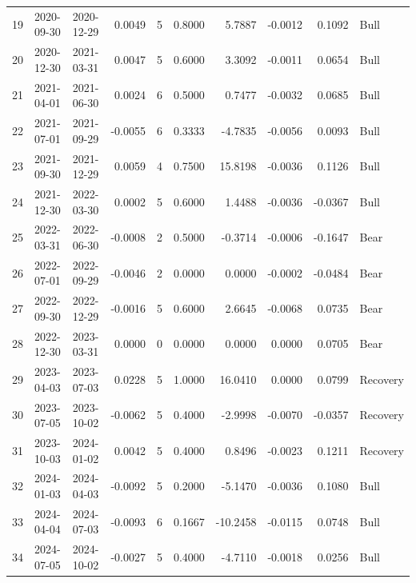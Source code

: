 \begin{tabular}{rllrrrrrrl}
19 & 2020-09-30 & 2020-12-29 & 0.0049 & 5 & 0.8000 & 5.7887 & -0.0012 & 0.1092 & Bull \\
20 & 2020-12-30 & 2021-03-31 & 0.0047 & 5 & 0.6000 & 3.3092 & -0.0011 & 0.0654 & Bull \\
21 & 2021-04-01 & 2021-06-30 & 0.0024 & 6 & 0.5000 & 0.7477 & -0.0032 & 0.0685 & Bull \\
22 & 2021-07-01 & 2021-09-29 & -0.0055 & 6 & 0.3333 & -4.7835 & -0.0056 & 0.0093 & Bull \\
23 & 2021-09-30 & 2021-12-29 & 0.0059 & 4 & 0.7500 & 15.8198 & -0.0036 & 0.1126 & Bull \\
24 & 2021-12-30 & 2022-03-30 & 0.0002 & 5 & 0.6000 & 1.4488 & -0.0036 & -0.0367 & Bull \\
25 & 2022-03-31 & 2022-06-30 & -0.0008 & 2 & 0.5000 & -0.3714 & -0.0006 & -0.1647 & Bear \\
26 & 2022-07-01 & 2022-09-29 & -0.0046 & 2 & 0.0000 & 0.0000 & -0.0002 & -0.0484 & Bear \\
27 & 2022-09-30 & 2022-12-29 & -0.0016 & 5 & 0.6000 & 2.6645 & -0.0068 & 0.0735 & Bear \\
28 & 2022-12-30 & 2023-03-31 & 0.0000 & 0 & 0.0000 & 0.0000 & 0.0000 & 0.0705 & Bear \\
29 & 2023-04-03 & 2023-07-03 & 0.0228 & 5 & 1.0000 & 16.0410 & 0.0000 & 0.0799 & Recovery \\
30 & 2023-07-05 & 2023-10-02 & -0.0062 & 5 & 0.4000 & -2.9998 & -0.0070 & -0.0357 & Recovery \\
31 & 2023-10-03 & 2024-01-02 & 0.0042 & 5 & 0.4000 & 0.8496 & -0.0023 & 0.1211 & Recovery \\
32 & 2024-01-03 & 2024-04-03 & -0.0092 & 5 & 0.2000 & -5.1470 & -0.0036 & 0.1080 & Bull \\
33 & 2024-04-04 & 2024-07-03 & -0.0093 & 6 & 0.1667 & -10.2458 & -0.0115 & 0.0748 & Bull \\
34 & 2024-07-05 & 2024-10-02 & -0.0027 & 5 & 0.4000 & -4.7110 & -0.0018 & 0.0256 & Bull \\
\bottomrule
\end{tabular}
